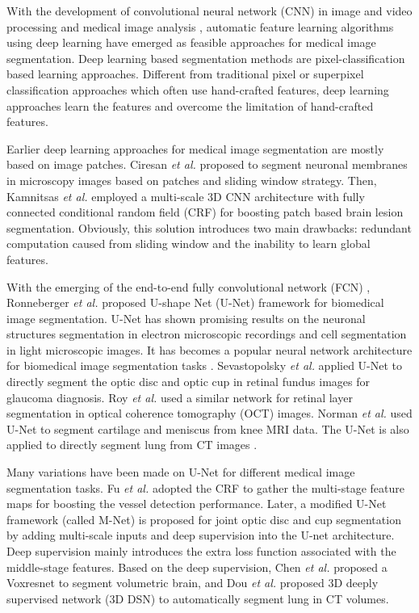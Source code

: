 \documentclass[journal]{IEEEtran}
\begin{document}
With the development of convolutional neural network (CNN) in image and video processing \cite{krizhevsky2012imagenet} and medical image analysis \cite{zhou2018multi, wang2017zoom}, automatic feature learning algorithms using deep learning have emerged as feasible approaches for medical image segmentation. Deep learning based segmentation methods are pixel-classification based learning approaches. Different from traditional pixel or superpixel classification approaches which often use hand-crafted features, deep learning approaches learn the features and overcome the limitation of hand-crafted features. 

Earlier deep learning approaches for  medical image segmentation are mostly based on image patches. Ciresan \emph{et al.} \cite{ciresan2012deep}  proposed to  segment neuronal membranes in microscopy images based on patches and sliding window strategy. Then, Kamnitsas \emph{et al.} \cite{kamnitsas2017efficient} employed a multi-scale 3D CNN architecture with fully connected conditional random field (CRF) for boosting patch based brain lesion segmentation.    Obviously, this solution introduces two main drawbacks: redundant computation caused from sliding window and the inability to learn global features.

With the emerging of the end-to-end fully convolutional network (FCN) \cite{long2015fully}, 
Ronneberger \emph{et al.} \cite{ronneberger2015u} proposed U-shape Net (U-Net) framework for biomedical image segmentation. U-Net  has shown promising results on the neuronal structures segmentation in electron microscopic recordings and cell segmentation in light microscopic images.
It has becomes a popular neural network architecture for biomedical image segmentation tasks \cite{norman2018use, sevastopolsky2017optic, roy2017relaynet, skourt2018lung}.  Sevastopolsky \emph{et al.} \cite{sevastopolsky2017optic} applied U-Net to directly segment the optic disc and optic cup in retinal fundus images for glaucoma diagnosis. Roy \emph{et al.} \cite{roy2017relaynet} used a similar network for retinal layer segmentation in optical coherence tomography (OCT) images. Norman \emph{et al.} \cite{norman2018use} used U-Net to segment cartilage and meniscus from knee MRI data. The U-Net is also applied to directly segment lung from CT images \cite{skourt2018lung}. 

Many variations have been made on U-Net  for different medical image segmentation tasks. Fu \emph{et al.} \cite{fu2016deepvessel} adopted the CRF to gather the multi-stage feature maps for boosting the vessel detection performance. 
Later, a modified U-Net framework (called M-Net) \cite{fu2018joint} is proposed for joint optic disc and cup segmentation by adding multi-scale inputs and deep supervision into the U-net architecture. Deep supervision mainly introduces the extra loss function associated with the middle-stage features. Based on the deep supervision, Chen \emph{et al.} \cite{chen2016voxresnet} proposed a Voxresnet to segment volumetric brain, and Dou \emph{et al.} \cite{dou20163d} proposed 3D deeply supervised network (3D DSN) to automatically segment lung in CT volumes. 
\end{document}
